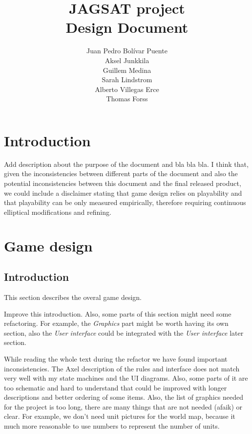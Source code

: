 \documentclass[12pt,a4paper]{article}
\title{\large JAGSAT project\\\huge Design Document}
\author{
  Juan Pedro Bolívar Puente\\ 
  Aksel Junkkila\\
  Guillem Medina\\ 
  Sarah Lindstrom\\ 
  Alberto Villegas Erce\\ 
  Thomas Forss
}
\let\stdsection\section
\renewcommand\section{\newpage\stdsection}
\begin{document}
\maketitle

\tableofcontents
\pagebreak

\section{Introduction}

\begin{todo}
  Add description about the purpose of the document and bla bla bla. I
  think that, given the inconsistencies between different parts of the
  document and also the potential inconsistencies between this
  document and the final released product, we could include a
  disclaimer stating that game design relies on playability and that
  playability can be only measured empirically, therefore requiring
  continuous elliptical modifications and refining. 
\end{todo}

\section{Game design}

\subsection{Introduction}

This section describes the overal game design.

\begin{todo}
  Improve this introduction. Also, some parts of this section might need
  some refactoring. For example, the \emph{Graphics} part might be worth
  having its own section, also the \emph{User interface} could be
  integrated with the \emph{User interface} later section.
\end{todo}

\begin{todo}
  While reading the whole text during the refactor we have found
  important inconsistencies. The Axel description of the rules and
  interface does not match very well with my state machines and the UI
  diagrams. Also, some parts of it are too schematic and hard to
  understand that could be improved with longer descriptions and
  better ordering of some items. Also, the list of graphics needed for
  the project is too long, there are many things that are not needed
  (afaik) or clear. For example, we don't need unit pictures for the
  world map, because it much more reasonable to use numbers to
  represent the number of units.
\end{todo}
\end{document}
